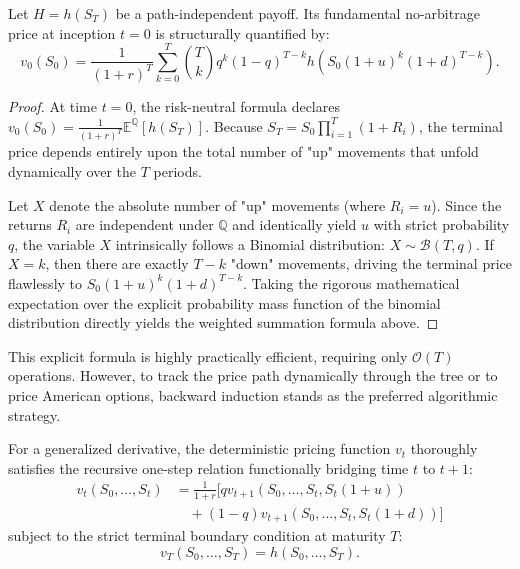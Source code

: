 \begin{proposition}
    Let $H = h(S_T)$ be a path-independent payoff. Its fundamental no-arbitrage price at inception $t=0$ is structurally quantified by:
    \begin{equation}
        v_0(S_0) = \frac{1}{(1+r)^T} \sum_{k=0}^T \binom{T}{k} q^k (1-q)^{T-k} h\left(S_0(1+u)^k(1+d)^{T-k}\right).
    \end{equation}
\end{proposition}

\begin{proof}
    At time $t=0$, the risk-neutral formula declares $v_0(S_0) = \frac{1}{(1+r)^T} \mathbb{E}^\mathbb{Q}[h(S_T)]$. Because $S_T = S_0 \prod_{i=1}^T (1+R_i)$, the terminal price depends entirely upon the total number of "up" movements that unfold dynamically over the $T$ periods. 
    
    Let $X$ denote the absolute number of "up" movements (where $R_i = u$). Since the returns $R_i$ are independent under $\mathbb{Q}$ and identically yield $u$ with strict probability $q$, the variable $X$ intrinsically follows a Binomial distribution: $X \sim \mathcal{B}(T, q)$.
    If $X = k$, then there are exactly $T-k$ "down" movements, driving the terminal price flawlessly to $S_0(1+u)^k(1+d)^{T-k}$.
    Taking the rigorous mathematical expectation over the explicit probability mass function of the binomial distribution directly yields the weighted summation formula above.
\end{proof}

This explicit formula is highly practically efficient, requiring only $\mathcal{O}(T)$ operations. However, to track the price path dynamically through the tree or to price American options, backward induction stands as the preferred algorithmic strategy.

\begin{proposition}
    For a generalized derivative, the deterministic pricing function $v_t$ thoroughly satisfies the recursive one-step relation functionally bridging time $t$ to $t+1$:
    \begin{align} \label{eq:backward_induction}
        v_t(S_0, \dots, S_t) &= \frac{1}{1+r} \Big[ q v_{t+1}(S_0, \dots, S_t, S_t(1+u)) \nonumber \\
        &\quad + (1-q) v_{t+1}(S_0, \dots, S_t, S_t(1+d)) \Big]
    \end{align}
    subject to the strict terminal boundary condition at maturity $T$:
    \begin{equation}
        v_T(S_0, \dots, S_T) = h(S_0, \dots, S_T).
    \end{equation}
\end{proposition}

